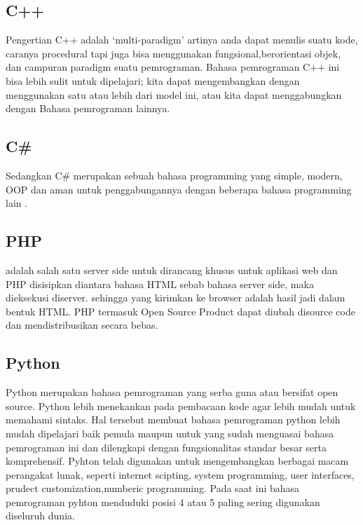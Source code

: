\subsection {C++}
	Pengertian C++ adalah `multi-paradigm' artinya anda dapat menulis suatu kode, caranya procedural 
tapi juga bisa menggunakan fungsional,berorientasi objek, dan campuran paradigm suatu pemrograman.  
Bahasa pemrograman C++ ini bisa lebih sulit untuk dipelajari; kita dapat mengembangkan dengan 
menggunakan satu atau lebih dari model ini,  atau kita dapat menggabungkan dengan Bahasa pemrograman lainnya.

\subsection {C\#}
	Sedangkan C\# merupakan sebuah bahasa programming yang simple, modern, OOP dan aman untuk 
penggabungannya dengan beberapa bahasa programming lain
\cite{hejlsberg2003c}.

\subsection {PHP}
 	adalah salah satu server side untuk dirancang khusus untuk aplikasi web dan PHP disisipkan diantara bahasa HTML sebab bahasa server side, maka dieksekusi diserver. sehingga yang kirimkan ke browser adalah hasil jadi dalam bentuk HTML. PHP termasuk Open Source Product dapat diubah disource code dan mendistribusikan secara bebas.

\subsection{Python}
	Python merupakan  bahasa pemrograman yang serba guna atau bersifat open source. 
Python lebih menekankan pada pembacaan  kode agar lebih mudah untuk memahami sintaks. 
Hal tersebut membuat bahasa pemrograman python lebih mudah dipelajari baik pemula maupun untuk yang 
sudah menguasai bahasa pemrograman ini dan dilengkapi dengan fungsionalitas standar besar serta 
komprehensif. Pyhton telah digunakan untuk mengembangkan berbagai macam perangakat lunak, seperti 
internet scipting, system programming, user interfaces, prudect customization,numberic programming. 
Pada saat ini bahasa pemrograman pyhton menduduki posisi 4 atau 5 paling sering digunakan diseluruh dunia.

